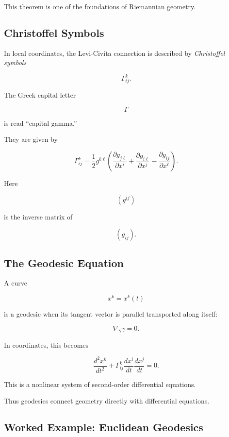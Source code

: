 This theorem is one of the foundations of Riemannian geometry.

\subsection{Christoffel Symbols}
\label{subsec:christoffel-symbols}

In local coordinates, the Levi-Civita connection is described by
\emph{Christoffel symbols}

\[
\boxed{
\Gamma^k_{ij}.
}
\]

The Greek capital letter

\[
\Gamma
\]

is read ``capital gamma.''

They are given by

\[
\boxed{
\Gamma^k_{ij}
=
\frac12
g^{k\ell}
\left(
\frac{\partial g_{j\ell}}{\partial x^i}
+
\frac{\partial g_{i\ell}}{\partial x^j}
-
\frac{\partial g_{ij}}{\partial x^\ell}
\right).
}
\]

Here

\[
(g^{ij})
\]

is the inverse matrix of

\[
(g_{ij}).
\]

\subsection{The Geodesic Equation}
\label{subsec:geodesic-equation}

A curve

\[
x^k=x^k(t)
\]

is a geodesic when its tangent vector is parallel transported along itself:

\[
\boxed{
\nabla_{\dot{\gamma}}\dot{\gamma}=0.
}
\]

In coordinates, this becomes

\[
\boxed{
\frac{d^2x^k}{dt^2}
+
\Gamma^k_{ij}
\frac{dx^i}{dt}
\frac{dx^j}{dt}
=
0.
}
\]

This is a nonlinear system of second-order differential equations.

Thus geodesics connect geometry directly with differential equations.

\subsection{Worked Example: Euclidean Geodesics}
\label{subsec:worked-euclidean-geodesics}

